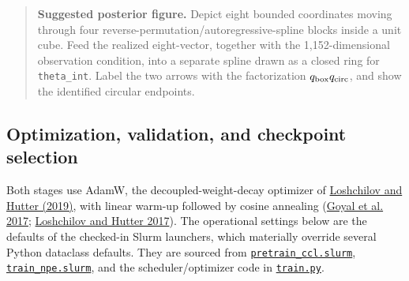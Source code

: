\documentclass[11pt]{article}
\newcommand{\code}[1]{\nolinkurl{#1}}
\begin{document}
\begin{quote}
\small
\textbf{Suggested posterior figure.} Depict eight bounded coordinates moving
through four reverse-permutation/autoregressive-spline blocks inside a unit
cube. Feed the realized eight-vector, together with the 1,152-dimensional
observation condition, into a separate spline drawn as a closed ring for
\code{theta_int}. Label the two arrows with the factorization
\(q_{\rm box}q_{\rm circ}\), and show the identified circular endpoints.
\end{quote}

\subsection{Optimization, validation, and checkpoint selection}

Both stages use AdamW, the decoupled-weight-decay optimizer of \hyperlink{ref:adamw}{Loshchilov and Hutter (2019)}, with linear warm-up followed by cosine annealing
(\hyperlink{ref:goyal2017}{Goyal et al. 2017}; \hyperlink{ref:sgdr}{Loshchilov and Hutter 2017}). The
operational settings below are the defaults of the checked-in Slurm launchers,
which materially override several Python dataclass defaults. They are sourced
from \href{../arch/pretrain_ccl.slurm}{\code{pretrain_ccl.slurm}},
\href{../arch/train_npe.slurm}{\code{train_npe.slurm}}, and the scheduler/optimizer code
in \href{../arch/train.py}{\code{train.py}}.
\end{document}
